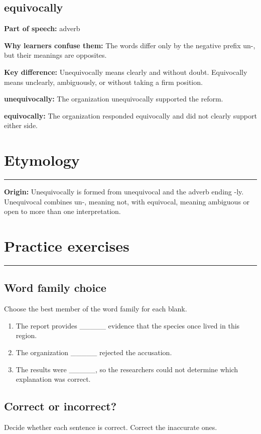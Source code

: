 \documentclass[11pt]{article}
\newcommand{\sectionrule}{\par\vspace{-0.5em}\noindent\textcolor{Accent}{\rule{\linewidth}{0.6pt}}\par}
\begin{document}
\subsection{equivocally}
\textbf{Part of speech:} adverb

\textbf{Why learners confuse them:} The words differ only by the negative prefix un-, but their meanings are opposites.

\textbf{Key difference:} Unequivocally means clearly and without doubt. Equivocally means unclearly, ambiguously, or without taking a firm position.

\textbf{unequivocally:} The organization unequivocally supported the reform.

\textbf{equivocally:} The organization responded equivocally and did not clearly support either side.

\section{Etymology}
\sectionrule
\textbf{Origin:} Unequivocally is formed from unequivocal and the adverb ending -ly. Unequivocal combines un-, meaning not, with equivocal, meaning ambiguous or open to more than one interpretation.

\section{Practice exercises}
\sectionrule
\subsection{Word family choice}
Choose the best member of the word family for each blank.

\begin{enumerate}
  \item The report provides \_\_\_\_\_ evidence that the species once lived in this region.
  \item The organization \_\_\_\_\_ rejected the accusation.
  \item The results were \_\_\_\_\_, so the researchers could not determine which explanation was correct.
\end{enumerate}

\subsection{Correct or incorrect?}
Decide whether each sentence is correct. Correct the inaccurate ones.
\end{document}

